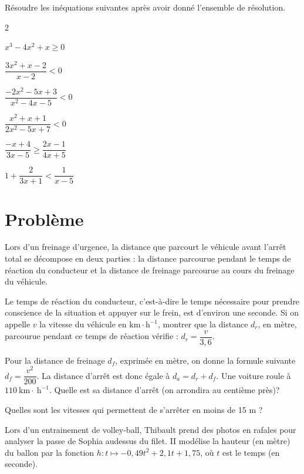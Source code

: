 \documentclass[11pt,a4paper]{article}  %
\begin{document}
\exercice{}

Résoudre les inéquations suivantes après avoir donné l'ensemble de résolution.
\begin{multicols}{2}
	\begin{enumMet}
		\item $x^3-4 x^2+x \geqslant 0$
		\item $\dfrac{3 x^2+x-2}{x-2}<0$
		\item $\dfrac{-2 x^2-5 x+3}{x^2-4 x-5}<0$
		\item $\dfrac{x^2+x+1}{2 x^2-5 x+7}<0$
		\item $\dfrac{-x+4}{3 x-5} \geqslant \dfrac{2 x-1}{4 x+5}$
		\item $1+\dfrac{2}{3 x+1}<\dfrac{1}{x-5}$
	\end{enumMet}
\end{multicols}

\section*{Problème}

Lors d'un freinage d'urgence, la distance que parcourt le véhicule avant l'arrêt total se décompose en deux parties : la distance parcourue pendant le temps de réaction du conducteur et la distance de freinage parcourue au cours du freinage du véhicule.
\begin{enumMet}
	\item Le temps de réaction du conducteur, c'est-à-dire le temps nécessaire pour prendre conscience de la situation et appuyer sur le frein, est d'environ une seconde. Si on appelle $v$ la vitesse du véhicule en $\mathrm{km} \cdot \mathrm{h}^{-1}$, montrer que la distance $d_r$, en mètre, parcourue pendant ce temps de réaction vérifie : $d_r=\dfrac{v}{3,6}$.
	\item Pour la distance de freinage $d_f$, exprimée en mètre, on donne la formule suivante $d_f=\dfrac{v^2}{200}$.
	La distance d'arrêt est donc égale à $d_a=d_r+d_f$.
	Une voiture roule à $110 \mathrm{~km} \cdot \mathrm{~h}^{-1}$. Quelle est sa distance d'arrêt (on arrondira au centième près)?
	\item Quelles sont les vitesses qui permettent de s'arrêter en moins de 15 m ?
\end{enumMet}

\exercice{}

Lors d'un entrainement de volley-ball, Thibault prend des photos en rafales pour analyser la passe de Sophia audessus du filet. II modélise la hauteur (en mètre) du ballon par la fonction $h: t \mapsto-0,49 t^2+2,1 t+1,75$, où $t$ est le temps (en seconde).
\end{document}

